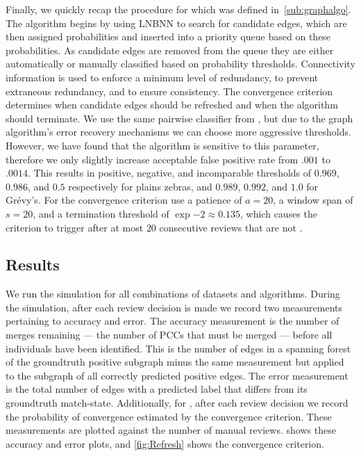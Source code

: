    Finally, we quickly recap the procedure for  which was defined in~\cref{sub:graphalgo}.
    The algorithm begins by using LNBNN to search for candidate edges, which are then assigned probabilities and
      inserted into a priority queue based on these probabilities.
    As candidate edges are removed from the queue they are either automatically or manually classified based on
      probability thresholds.
    Connectivity information is used to enforce a minimum level of redundancy, to prevent extraneous redundancy,
      and to ensure consistency.
    The convergence criterion determines when candidate edges should be refreshed and when the algorithm should
      terminate.
    We use the same pairwise classifier from , but due to the graph algorithm's error recovery
      mechanisms we can choose more aggressive thresholds.
    However, we have found that the algorithm is sensitive to this parameter, therefore we only slightly increase
      acceptable false positive rate from $.001$ to $.0014$.
    This results in positive, negative, and incomparable thresholds of $0.969$, $0.986$, and $0.5$ respectively
      for plains zebras, and $0.989$, $0.992$, and $1.0$ for Grévy's.
    For the convergence criterion use a patience of $a=20$, a window span of $s=20$, and a termination threshold
      of $\exp{-2}\approx0.135$, which causes the criterion to trigger after at most $20$ consecutive reviews that
      are not \meaningful{}.

    \subsection{Results}

    We run the simulation for all combinations of datasets and algorithms.
    During the simulation, after each review decision is made we record two measurements pertaining to accuracy
      and error.
    The accuracy measurement is the number of merges remaining --- \ie{} the number of PCCs that must be merged
      --- before all individuals have been identified.
    This is the number of edges in a spanning forest of the groundtruth positive subgraph minus the same
      measurement but applied to the subgraph of all correctly predicted positive edges.
    The error measurement is the total number of edges with a predicted label that differs from its groundtruth
      match-state.
    Additionally, for , after each review decision we record the probability of convergence estimated
      by the convergence criterion.
    These measurements are plotted against the number of manual reviews.
     shows these accuracy and error plots, and \cref{fig:Refresh} shows the convergence
      criterion.

